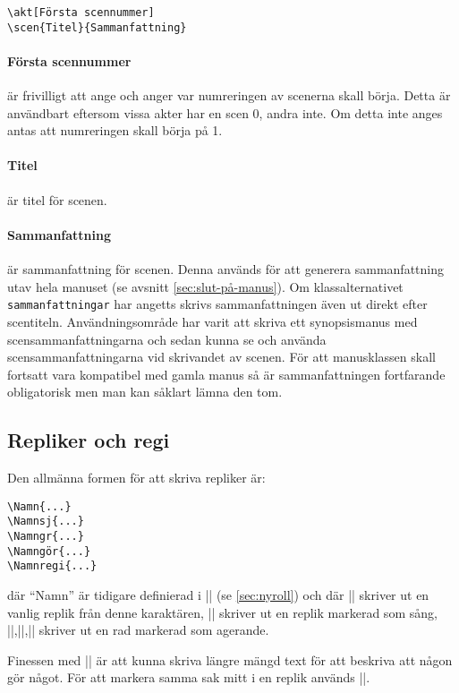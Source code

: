\documentclass[a4paper,12pt]{article}
\begin{document}
\begin{lstlisting}
\akt[Första scennummer]
\scen{Titel}{Sammanfattning}
\end{lstlisting}

\paragraph{Första scennummer} är frivilligt att ange och anger var numreringen av scenerna skall börja. Detta är användbart eftersom vissa akter har en scen 0, andra inte. Om detta inte anges antas att numreringen skall börja på 1.

\paragraph{Titel} är titel för scenen.

\paragraph{Sammanfattning} är sammanfattning för scenen. Denna används för att generera sammanfattning utav hela manuset (se avsnitt \ref{sec:slut-på-manus}). Om klassalternativet \texttt{samman\-fattningar} har angetts skrivs sammanfattningen även ut direkt efter scentiteln. Användningsområde har varit att skriva ett synopsismanus med scensammanfattningarna och sedan kunna se och använda scensammanfattningarna vid skrivandet av scenen. För att manusklassen skall fortsatt vara kompatibel med gamla manus så är sammanfattningen fortfarande obligatorisk men man kan såklart lämna den tom.




\subsection{Repliker och regi}
\label{sec:repliker}
Den allmänna formen för att skriva repliker är:
\begin{lstlisting}
\Namn{...}
\Namnsj{...}
\Namngr{...}
\Namngör{...}
\Namnregi{...}
\end{lstlisting}
där ``Namn'' är tidigare definierad i |\nyroll| (se \ref{sec:nyroll}) och där |\Namn| skriver ut en vanlig replik från denne karaktären, |\Namnsj| skriver ut en replik markerad som sång, |\Namngr|,||,|\Namnregi| skriver ut en rad markerad som agerande.

Finessen med |\Namngr| är att kunna skriva längre mängd text för att beskriva att någon gör något. För att markera samma sak mitt i en replik används |\gr|.
\end{document}
